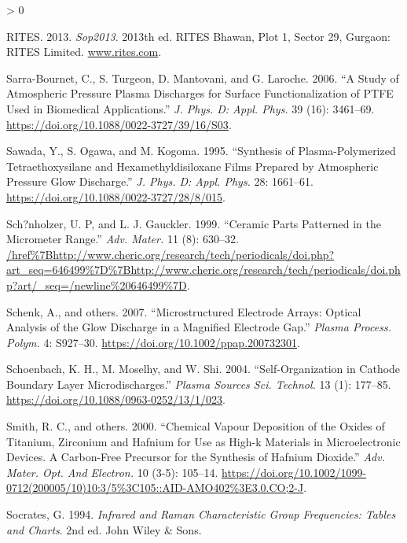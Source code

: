 \documentclass[
  10pt,
  twoside]{article}
\newlength{\cslhangindent}
\newenvironment{CSLReferences}[2] %
 {%
  \setlength{\parindent}{0pt}
  \ifodd #1 \everypar{\setlength{\hangindent}{\cslhangindent}}\ignorespaces\fi
  \ifnum #2 > 0
  \setlength{\parskip}{#2\baselineskip}
  \fi
 }%
 {}
\begin{document}
\begin{CSLReferences}{1}{0}
\leavevmode\hypertarget{ref-SOP2013RITES}{}%
RITES. 2013. \emph{Sop2013}. 2013th ed. RITES Bhawan, Plot 1, Sector 29, Gurgaon: RITES Limited. \href{https://www.rites.com}{www.rites.com}.

\leavevmode\hypertarget{ref-Sarr06}{}%
Sarra-Bournet, C., S. Turgeon, D. Mantovani, and G. Laroche. 2006. {``A Study of Atmospheric Pressure Plasma Discharges for Surface Functionalization of {PTFE} Used in Biomedical Applications.''} \emph{J. Phys. D: Appl. Phys.} 39 (16): 3461--69. \url{https://doi.org/10.1088/0022-3727/39/16/S03}.

\leavevmode\hypertarget{ref-Sawa1995}{}%
Sawada, Y., S. Ogawa, and M. Kogoma. 1995. {``Synthesis of Plasma-Polymerized Tetraethoxysilane and Hexamethyldisiloxane Films Prepared by Atmospheric Pressure Glow Discharge.''} \emph{J. Phys. D: Appl. Phys.} 28: 1661--61. \url{https://doi.org/10.1088/0022-3727/28/8/015}.

\leavevmode\hypertarget{ref-Scho1999}{}%
Sch?nholzer, U. P, and L. J. Gauckler. 1999. {``Ceramic Parts Patterned in the Micrometer Range.''} \emph{Adv. Mater.} 11 (8): 630--32. \url{/href\%7Bhttp://www.cheric.org/research/tech/periodicals/doi.php?art_seq=646499\%7D\%7Bhttp://www.cheric.org/research/tech/periodicals/doi.php?art/_seq=/newline\%20646499\%7D}.

\leavevmode\hypertarget{ref-Sche07}{}%
Schenk, A., and others. 2007. {``Microstructured Electrode Arrays: Optical Analysis of the Glow Discharge in a Magnified Electrode Gap.''} \emph{Plasma Process. Polym.} 4: S927--30. \url{https://doi.org/10.1002/ppap.200732301}.

\leavevmode\hypertarget{ref-Scho04}{}%
Schoenbach, K. H., M. Moselhy, and W. Shi. 2004. {``Self-Organization in Cathode Boundary Layer Microdischarges.''} \emph{Plasma Sources Sci. Technol.} 13 (1): 177--85. \url{https://doi.org/10.1088/0963-0252/13/1/023}.

\leavevmode\hypertarget{ref-Smit00}{}%
Smith, R. C., and others. 2000. {``Chemical Vapour Deposition of the Oxides of Titanium, Zirconium and Hafnium for Use as High-k Materials in Microelectronic Devices. A Carbon-Free Precursor for the Synthesis of Hafnium Dioxide.''} \emph{Adv. Mater. Opt. And Electron.} 10 (3-5): 105--14. \url{https://doi.org/10.1002/1099-0712(200005/10)10:3/5\%3C105::AID-AMO402\%3E3.0.CO;2-J}.

\leavevmode\hypertarget{ref-Socr1994}{}%
Socrates, G. 1994. \emph{Infrared and Raman Characteristic Group Frequencies: Tables and Charts}. 2nd ed. John Wiley \& Sons.


\end{CSLReferences}
\end{document}
